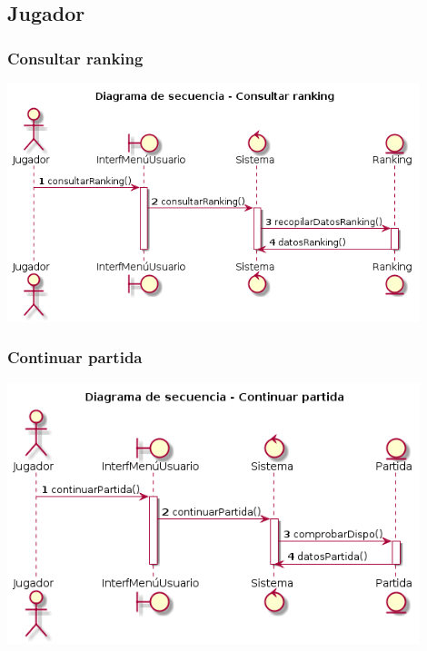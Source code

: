 \subsection{Jugador}\label{sec:uc0}
\subsubsection{Consultar ranking}
\begin{center}
  \includegraphics[width=0.9\textwidth]{./imatges/jugador/Consultar_ranking.png}
  \end{center}

\subsubsection{Continuar partida}
\begin{center}
  \includegraphics[width=0.9\textwidth]{./imatges/jugador/Continuar_partida.png}
  \end{center}
  
